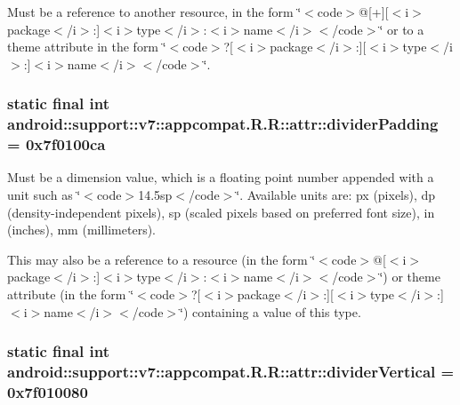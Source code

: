 Must be a reference to another resource, in the form \char`\"{}$<$code$>$@\mbox{[}+\mbox{]}\mbox{[}$<$i$>$package$<$/i$>$:\mbox{]}$<$i$>$type$<$/i$>$:$<$i$>$name$<$/i$>$$<$/code$>$\char`\"{} or to a theme attribute in the form \char`\"{}$<$code$>$?\mbox{[}$<$i$>$package$<$/i$>$:\mbox{]}\mbox{[}$<$i$>$type$<$/i$>$:\mbox{]}$<$i$>$name$<$/i$>$$<$/code$>$\char`\"{}. \hypertarget{classandroid_1_1support_1_1v7_1_1appcompat_1_1_r_1_1attr_1d8765f66957a6fc22139ba4cc569411}{
\subsubsection[{dividerPadding}]{\setlength{\rightskip}{0pt plus 5cm}static final int android::support::v7::appcompat.R.R::attr::dividerPadding = 0x7f0100ca}}
\label{classandroid_1_1support_1_1v7_1_1appcompat_1_1_r_1_1attr_1d8765f66957a6fc22139ba4cc569411}


Must be a dimension value, which is a floating point number appended with a unit such as \char`\"{}$<$code$>$14.5sp$<$/code$>$\char`\"{}. Available units are: px (pixels), dp (density-independent pixels), sp (scaled pixels based on preferred font size), in (inches), mm (millimeters). 

This may also be a reference to a resource (in the form \char`\"{}$<$code$>$@\mbox{[}$<$i$>$package$<$/i$>$:\mbox{]}$<$i$>$type$<$/i$>$:$<$i$>$name$<$/i$>$$<$/code$>$\char`\"{}) or theme attribute (in the form \char`\"{}$<$code$>$?\mbox{[}$<$i$>$package$<$/i$>$:\mbox{]}\mbox{[}$<$i$>$type$<$/i$>$:\mbox{]}$<$i$>$name$<$/i$>$$<$/code$>$\char`\"{}) containing a value of this type. \hypertarget{classandroid_1_1support_1_1v7_1_1appcompat_1_1_r_1_1attr_f6161dfedec9cb24c0623a20f9e6898b}{
\subsubsection[{dividerVertical}]{\setlength{\rightskip}{0pt plus 5cm}static final int android::support::v7::appcompat.R.R::attr::dividerVertical = 0x7f010080}}
\label{classandroid_1_1support_1_1v7_1_1appcompat_1_1_r_1_1attr_f6161dfedec9cb24c0623a20f9e6898b}


